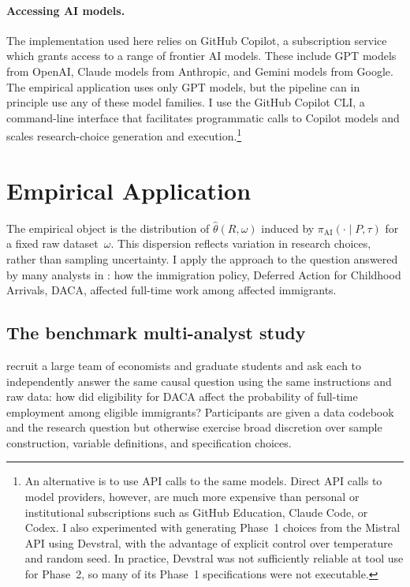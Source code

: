 \documentclass[12pt]{article}
\begin{document}
\paragraph{Accessing AI models.}
The implementation used here relies on GitHub Copilot, a subscription service which grants access to a range of frontier AI models. These include GPT models from OpenAI, Claude models from Anthropic, and Gemini models from Google. The empirical application uses only GPT models, but the pipeline can in principle use any of these model families. I use the GitHub Copilot CLI, a command-line interface that facilitates programmatic calls to Copilot models and scales research-choice generation and execution.\footnote{An alternative is to use API calls to the same models. Direct API calls to model providers, however, are much more expensive than personal or institutional subscriptions such as GitHub Education, Claude Code, or Codex. I also experimented with generating Phase~1 choices from the Mistral API using Devstral, with the advantage of explicit control over temperature and random seed. In practice, Devstral was not sufficiently reliable at tool use for Phase~2, so many of its Phase~1 specifications were not executable.}

\section{Empirical Application}
\label{sec:results}

The empirical object is the distribution of $\hat\theta(R,\omega)$ induced by $\pi_{\mathrm{AI}}(\cdot\mid P,\tau)$ for a fixed raw dataset~$\omega$. This dispersion reflects variation in research choices, rather than sampling uncertainty. I apply the approach to the question answered by many analysts in \citet{huntingtonklein2025sources}: how the immigration policy, Deferred Action for Childhood Arrivals, DACA, affected full-time work among affected immigrants.

\subsection{The benchmark multi-analyst study}
\label{sec:benchmark}

\citet{huntingtonklein2025sources} recruit a large team of economists and graduate students and ask each to independently answer the same causal question using the same instructions and raw data: how did eligibility for DACA affect the probability of full-time employment among eligible immigrants? Participants are given a data codebook and the research question but otherwise exercise broad discretion over sample construction, variable definitions, and specification choices.
\end{document}
